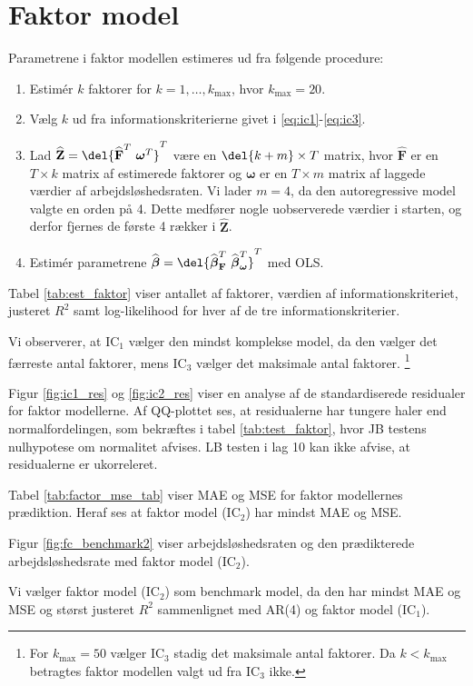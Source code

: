 \section{Faktor model}
Parametrene i faktor modellen estimeres ud fra følgende procedure:
\begin{enumerate}
\item Estimér $k$ faktorer for $k = 1, \dots, k_{\max}$, hvor $k_{\max} = 20$.  
\item Vælg $k$ ud fra informationskriterierne givet i \eqref{eq:ic1}-\eqref{eq:ic3}.
\item Lad \(\widehat{\textbf{Z}} = \del{\widehat{{\textbf{F}}}^T \ \boldsymbol{\omega}^T}^T\) være en \(\del{k+m} \times T\) matrix, hvor \(\widehat{{\textbf{F}}}\) er en \(T \times k\) matrix af estimerede faktorer og \(\boldsymbol{\omega}\) er en \(T \times m\) matrix af laggede værdier af arbejdsløshedsraten.
Vi lader \(m = 4\), da den autoregressive model valgte en orden på 4.
Dette medfører nogle uobserverede værdier i starten, og derfor fjernes de første 4 rækker i \(\widehat{\textbf{Z}}\).
\item Estimér parametrene $\widehat{\boldsymbol{\beta}} = \del{ \widehat{\boldsymbol{\beta}}^T_{\textbf{F}} \ \widehat{\boldsymbol{\beta}}^T_{\boldsymbol{\omega}}}^T$ med OLS.
\end{enumerate}

Tabel \ref{tab:est_faktor} viser antallet af faktorer, værdien af informationskriteriet, justeret \(R^2\) samt log-likelihood for hver af de tre informationskriterier. 


Vi observerer, at IC$_1$ vælger den mindst komplekse model, da den vælger det færreste antal faktorer, mens IC$_3$ vælger det maksimale antal faktorer. \footnote{For \(k_\text{max} = 50\) vælger IC\(_3\) stadig det maksimale antal faktorer. Da \(k<k_\text{max}\) betragtes faktor modellen valgt ud fra IC\(_3\) ikke.} 

Figur \ref{fig:ic1_res} og \ref{fig:ic2_res} viser en analyse af de standardiserede residualer for faktor modellerne.
Af QQ-plottet ses, at residualerne har tungere haler end normalfordelingen, som bekræftes i tabel \ref{tab:test_faktor}, hvor JB testens nulhypotese om normalitet afvises.
LB testen i lag 10 kan ikke afvise, at residualerne er ukorreleret.



Tabel \ref{tab:factor_mse_tab} viser MAE og MSE for faktor modellernes prædiktion.
Heraf ses at faktor model (IC\(_2\)) har mindst MAE og MSE.



Figur \ref{fig:fc_benchmark2} viser arbejdsløshedsraten og den prædikterede arbejdsløshedsrate med faktor model (IC\(_2\)).

Vi vælger faktor model (IC\(_2\)) som benchmark model, da den har mindst MAE og MSE og størst justeret \(R^2\) sammenlignet med AR(4) og faktor model (IC\(_1\)).
